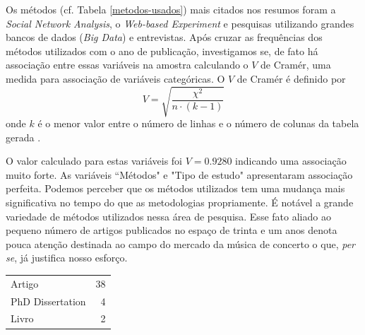 \documentclass[a4paper, 12pt, openright, oneside, german, french, english, brazil]{abntex2}
\begin{document}
	Os métodos (cf. Tabela \ref{metodos-usados}) mais citados nos resumos foram a \textit{Social Network Analysis}, o \textit{Web-based Experiment} e pesquisas utilizando grandes bancos de dados (\textit{Big Data}) e entrevistas. Após cruzar as frequências dos métodos utilizados com o ano de publicação, investigamos se, de fato há associação entre essas variáveis na amostra calculando o $V$ de Cramér, uma medida para associação de variáveis categóricas. O $V$ de Cramér é definido por $$ V = \sqrt{\frac{\chi^2}{n\cdot(k-1)}} $$ onde $k$ é o menor valor entre o número de linhas e o número de colunas da tabela gerada \cite{barbetta2012estatistica}.

	O valor calculado para estas variáveis foi $V=0.9280$ indicando uma associação muito forte. As variáveis ``Métodos" e "Tipo de estudo" apresentaram associação perfeita. Podemos perceber que os métodos utilizados tem uma mudança mais significativa no tempo do que as metodologias propriamente. É notável a grande variedade de métodos utilizados nessa área de pesquisa. Esse fato aliado ao pequeno número de artigos publicados no espaço de trinta e um anos denota pouca atenção destinada ao campo do mercado da música de concerto o que, \textit{per se}, já justifica nosso esforço.







	\begin{table}[ht]
		{\begin{tabular}{lr}
			\hline
			\hline
			Artigo &  38 \\
			PhD Dissertation &   4 \\
			Livro &   2 \\
			\hline
			\end{tabular}
		}
		{}
	\end{table}






\end{document}

